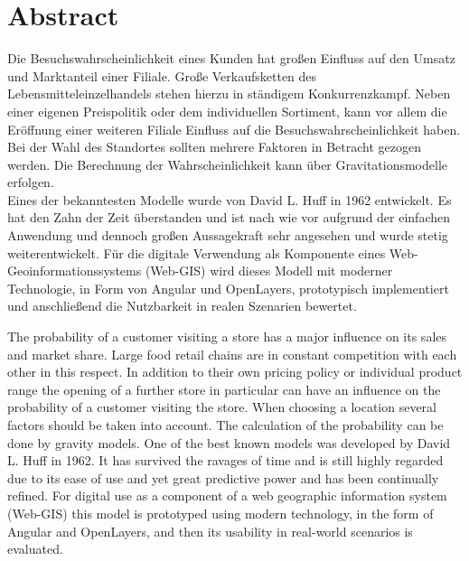 \chapter*{Abstract}
Die Besuchswahrscheinlichkeit eines Kunden hat großen Einfluss auf den Umsatz und Marktanteil einer Filiale.
Große Verkaufsketten des Lebensmitteleinzelhandels stehen hierzu in ständigem Konkurrenzkampf.
Neben einer eigenen Preispolitik oder dem individuellen Sortiment, kann vor allem die Eröffnung einer weiteren Filiale Einfluss auf die Besuchswahrscheinlichkeit haben.
Bei der Wahl des Standortes sollten mehrere Faktoren in Betracht gezogen werden.
Die Berechnung der Wahrscheinlichkeit kann über Gravitationsmodelle  erfolgen.\\
Eines der bekanntesten Modelle wurde von David L. Huff in 1962 entwickelt.
Es hat den Zahn der Zeit überstanden und ist nach wie vor aufgrund der einfachen Anwendung und dennoch großen Aussagekraft sehr angesehen und wurde stetig weiterentwickelt. 
Für die digitale Verwendung als Komponente eines Web-Geoinformationssystems (Web-GIS) wird dieses Modell mit moderner Technologie, in Form von Angular und OpenLayers, prototypisch implementiert und anschließend die Nutzbarkeit in realen Szenarien bewertet.

The probability of a customer visiting a store has a major influence on its sales and market share.
Large food retail chains are in constant competition with each other in this respect.
In addition to their own pricing policy or individual product range the opening of a further store in particular can have an influence on the probability of a customer visiting the store.
When choosing a location several factors should be taken into account.
The calculation of the probability can be done by gravity models.
One of the best known models was developed by David L. Huff in 1962.
It has survived the ravages of time and is still highly regarded due to its ease of use and yet great predictive power and has been continually refined. 
For digital use as a component of a web geographic information system (Web-GIS) this model is prototyped using modern technology, in the form of Angular and OpenLayers, and then its usability in real-world scenarios is evaluated.